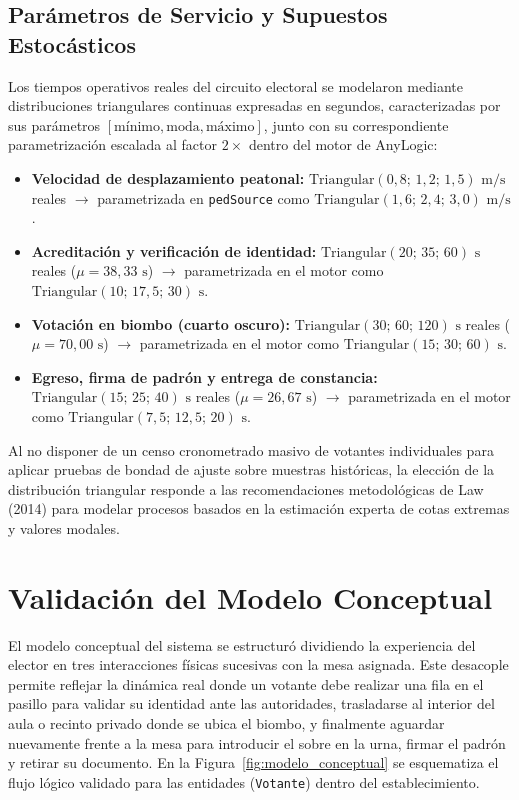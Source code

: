 \documentclass[11pt,a4paper]{article}
\begin{document}
\subsection{Parámetros de Servicio y Supuestos Estocásticos}
Los tiempos operativos reales del circuito electoral se modelaron mediante distribuciones triangulares continuas expresadas en segundos, caracterizadas por sus parámetros $[\text{mínimo}, \text{moda}, \text{máximo}]$, junto con su correspondiente parametrización escalada al factor $2\times$ dentro del motor de AnyLogic:
\begin{itemize}
    \item \textbf{Velocidad de desplazamiento peatonal:} $\text{Triangular}(0{,}8;\, 1{,}2;\, 1{,}5)\text{ m/s}$ reales $\rightarrow$ parametrizada en \texttt{pedSource} como $\text{Triangular}(1{,}6;\, 2{,}4;\, 3{,}0)\text{ m/s}$.
    \item \textbf{Acreditación y verificación de identidad:} $\text{Triangular}(20;\, 35;\, 60)\text{ s}$ reales ($\mu = 38{,}33\text{ s}$) $\rightarrow$ parametrizada en el motor como $\text{Triangular}(10;\, 17{,}5;\, 30)\text{ s}$.
    \item \textbf{Votación en biombo (cuarto oscuro):} $\text{Triangular}(30;\, 60;\, 120)\text{ s}$ reales ($\mu = 70{,}00\text{ s}$) $\rightarrow$ parametrizada en el motor como $\text{Triangular}(15;\, 30;\, 60)\text{ s}$.
    \item \textbf{Egreso, firma de padrón y entrega de constancia:} $\text{Triangular}(15;\, 25;\, 40)\text{ s}$ reales ($\mu = 26{,}67\text{ s}$) $\rightarrow$ parametrizada en el motor como $\text{Triangular}(7{,}5;\, 12{,}5;\, 20)\text{ s}$.
\end{itemize}
Al no disponer de un censo cronometrado masivo de votantes individuales para aplicar pruebas de bondad de ajuste sobre muestras históricas, la elección de la distribución triangular responde a las recomendaciones metodológicas de Law (2014) para modelar procesos basados en la estimación experta de cotas extremas y valores modales.

\section{Validación del Modelo Conceptual}
El modelo conceptual del sistema se estructuró dividiendo la experiencia del elector en tres interacciones físicas sucesivas con la mesa asignada. Este desacople permite reflejar la dinámica real donde un votante debe realizar una fila en el pasillo para validar su identidad ante las autoridades, trasladarse al interior del aula o recinto privado donde se ubica el biombo, y finalmente aguardar nuevamente frente a la mesa para introducir el sobre en la urna, firmar el padrón y retirar su documento. En la Figura~\ref{fig:modelo_conceptual} se esquematiza el flujo lógico validado para las entidades (\texttt{Votante}) dentro del establecimiento.
\end{document}

